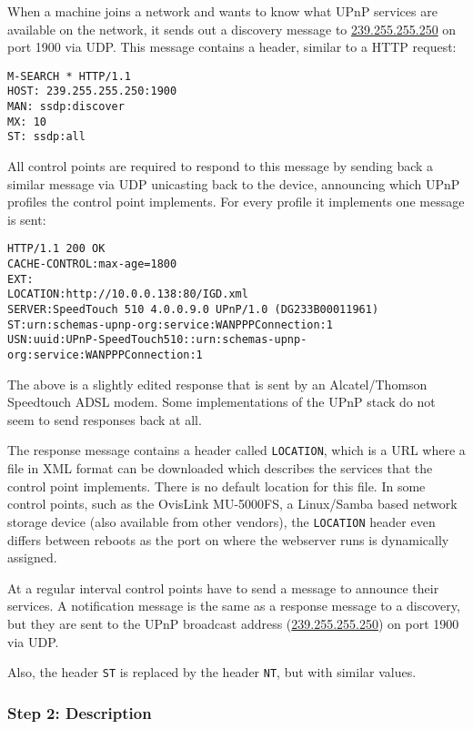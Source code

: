 \documentclass[10pt]{article}
\begin{document}
When a machine joins a network and wants to know what UPnP services are
available on the network, it sends out a discovery message to
\url{239.255.255.250} on port 1900 via UDP. This message contains a header,
similar to a HTTP request:

\begin{verbatim}
M-SEARCH * HTTP/1.1
HOST: 239.255.255.250:1900
MAN: ssdp:discover
MX: 10
ST: ssdp:all
\end{verbatim}

All control points are required to respond to this message by sending back a
similar message via UDP unicasting back to the device, announcing which UPnP
profiles the control point implements. For every profile it implements one
message is sent:

\begin{verbatim}
HTTP/1.1 200 OK
CACHE-CONTROL:max-age=1800
EXT:
LOCATION:http://10.0.0.138:80/IGD.xml
SERVER:SpeedTouch 510 4.0.0.9.0 UPnP/1.0 (DG233B00011961)
ST:urn:schemas-upnp-org:service:WANPPPConnection:1
USN:uuid:UPnP-SpeedTouch510::urn:schemas-upnp-org:service:WANPPPConnection:1
\end{verbatim}

The above is a slightly edited response that is sent by an Alcatel/Thomson
Speedtouch ADSL modem. Some implementations of the UPnP stack do not seem to
send responses back at all.

The response message contains a header called \texttt{LOCATION}, which
is a URL where a file in XML format can be downloaded which describes the
services that the control point implements. There is no default location for
this file. In some control points, such as the OvisLink MU-5000FS, a
Linux/Samba based network storage device (also available from other vendors),
the \texttt{LOCATION} header even differs between reboots as the port on
where the webserver runs is dynamically assigned.

At a regular interval control points have to send a message to announce
their services. A notification message is the same as a response message to
a discovery, but they are sent to the UPnP broadcast address
(\url{239.255.255.250}) on port 1900 via UDP.

Also, the header \texttt{ST} is replaced by the header \texttt{NT}, but with
similar values.

\subsubsection{Step 2: Description}
\end{document}
